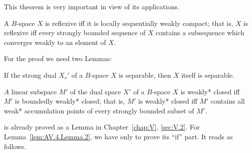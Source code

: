 This theorem is very important in view of its applications. 

\begin{theoremn} A $B$-space $X$ is reflexive iff it is locally sequentially weakly compact; that is, $X$ is reflexive iff every strongly bounded sequence of $X$ contains a subsequence which converges weakly to an element of $X$.

For the proof we need two Lemmas: 

\end{theoremn}
\begin{lemma}\label{lem:AV.4.Lemma.1} If the strong dual $X_s'$ of a $B$-space $X$ is separable, then $X$ itself is separable. 
\end{lemma}

\begin{lemma}\label{lem:AV.4.Lemma.2} $A$ linear subspace $M'$ of the dual space $X'$ of a $B$-space $X$ is weakly* closed iff $M'$ is boundedly weakly* closed; that is, $M'$ is weakly* closed iff $M'$ contains all weak* accumulation points of every strongly bounded subset of $M'$. 
\end{lemma}

\label{lem:AV.4.Lemma.1a}is already proved as a Lemma in Chapter~\ref{chap:V}, \ref{sec:V.2}. For Lemma~\ref{lem:AV.4.Lemma.2}, we have only to prove its ``if'' part. It reads as follows. 

